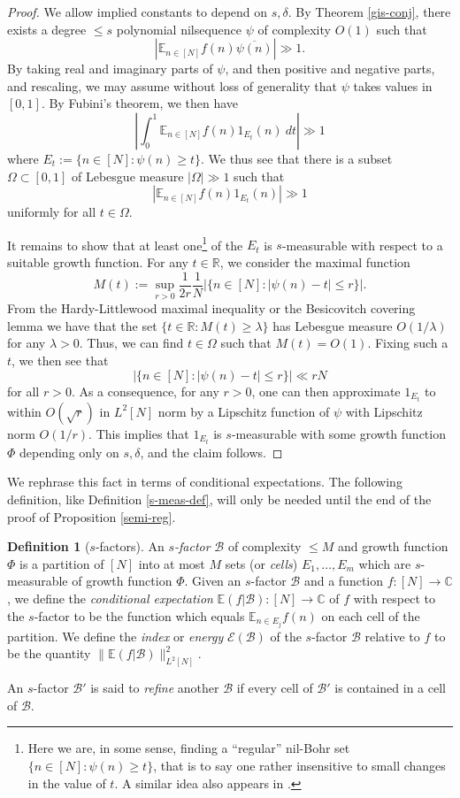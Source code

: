 \documentclass[11pt,reqno]{amsart}
\numberwithin{equation}{section}
\theoremstyle{plain}
\theoremstyle{definition}
\newtheorem{definition}[subsection]{Definition}
\renewcommand{\leq}{\leqslant}
\renewcommand{\geq}{\geqslant}
\newcommand\E{{\mathbb{E}}}
\newcommand\R{\mathbb{R}}
\newcommand\C{\mathbb{C}}
\newcommand\B{\mathcal{B}}
\newcommand\1{{\bf 1}}
\newcommand\2{{\bf 2}}
\begin{document}
\begin{proof}  We allow implied constants to depend on $s,\delta$.  By Theorem \ref{gis-conj}, there exists a degree $\leq s$ polynomial nilsequence $\psi$ of complexity $O(1)$ such that
$$ |\E_{n \in [N]} f(n) \overline{\psi(n)}| \gg 1.$$
By taking real and imaginary parts of $\psi$, and then positive and negative parts, and rescaling, we may assume without loss of generality that $\psi$ takes values in $[0,1]$.  By Fubini's theorem, we then have
$$ |\int_0^1 \E_{n \in [N]} f(n) 1_{E_t}(n)\ dt| \gg 1$$
where $E_t := \{ n \in [N]: \psi(n) \geq t \}$.  We thus see that there is a subset $\Omega \subset [0,1]$ of Lebesgue measure $|\Omega| \gg 1$ such that 
$$ |\E_{n \in [N]} f(n) 1_{E_t}(n)| \gg 1$$
uniformly for all $t \in \Omega$.

It remains to show that at least one\footnote{Here we are, in some sense, finding a ``regular'' nil-Bohr set $\{n \in [N] : \psi(n) \geq t\}$, that is to say one rather insensitive to small changes in the value of $t$.  A similar idea also appears in \cite[Claim 2.2]{rttv}.} of the $E_t$ is $s$-measurable with respect to a suitable growth function.  For any $t \in \R$, we consider the maximal function
$$ M(t) := \sup_{r>0} \frac{1}{2r} \frac{1}{N} |\{ n \in [N]: |\psi(n)-t| \leq r \}|.$$
From the Hardy-Littlewood maximal inequality or the Besicovitch covering lemma we have that the set $\{ t \in \R: M(t) \ge \lambda \}$ has Lebesgue measure $O(1/\lambda)$ for any $\lambda > 0$.  Thus, we can find $t \in \Omega$ such that $M(t)= O(1)$.  Fixing such a $t$, we then see that 
$$ |\{ n \in [N]: |\psi(n)-t| \leq r \}| \ll rN$$
for all $r>0$.  As a consequence, for any $r>0$, one can then approximate $1_{E_t}$ to within $O( \sqrt{r} )$ in $L^2[N]$ norm by a Lipschitz function of $\psi$ with Lipschitz norm $O(1/r)$.  This implies that $1_{E_t}$ is $s$-measurable with some growth function $\Phi$ depending only on $s,\delta$, and the claim follows.
\end{proof}

We rephrase this fact in terms of conditional expectations. The following definition, like Definition \ref{s-meas-def}, will only be needed until the end of the proof of Proposition \ref{semi-reg}.

\begin{definition}[$s$-factors] An \emph{$s$-factor} $\B$ of complexity $\leq M$ and growth function $\Phi$ is a partition of $[N]$ into at most $M$ sets (or \emph{cells}) $E_1,\ldots,E_m$ which are $s$-measurable of growth function $\Phi$.  Given an $s$-factor $\B$ and a function $f: [N] \to \C$, we define the \emph{conditional expectation} $\E(f|\B): [N] \to \C$ of $f$ with respect to the $s$-factor to be the function which equals $\E_{n \in E_j} f(n)$ on each cell of the partition.  We define the \emph{index} or \emph{energy} ${\mathcal E}(\B)$ of the $s$-factor $\B$ relative to $f$ to be the quantity $\|\E(f|\B)\|_{L^2[N]}^2$.  

An $s$-factor $\B'$ is said to \emph{refine} another $\B$ if every cell of $\B'$ is contained in a cell of $\B$.  
\end{definition}
\end{document}

